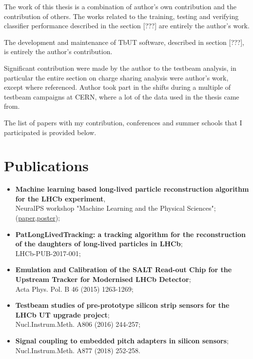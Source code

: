 \noindent The work of this thesis is a combination of author's own contribution and the contribution of others. The works related to the training, testing and verifying classifier performance described in the section [???] are entirely the author's work. 

\noindent The development and maintenance of TbUT software, described in section [???], is entirely the author's contribution. 

\noindent Significant contribution were made by the author to the testbeam analysis, in particular the entire section on charge sharing analysis were author's work, except where referenced. Author took part in the shifts during a multiple of testbeam campaigns at CERN, where a lot of the data used in the thesis came from. 

The list of papers with my contribution, conferences and summer schools that I participated is provided below. 

\section*{Publications}
			\begin{itemize}
			    \item \textbf{Machine learning based long-lived particle reconstruction algorithm for the LHCb experiment},\\ NeuralPS workshop "Machine Learning and the Physical Sciences"; (\textcolor{red}{\href{https://ml4physicalsciences.github.io/2020/files/NeurIPS_ML4PS_2020_148.pdf}{paper}},\textcolor{red}{\href{https://ml4physicalsciences.github.io/2020/files/NeurIPS_ML4PS_2020_148_poster.pdf}{poster}});
			    \item \textbf{PatLongLivedTracking: a tracking algorithm for the reconstruction of the daughters of long-lived particles in LHCb};\\ LHCb-PUB-2017-001;
				\item \textbf{Emulation and Calibration of the SALT Read-out Chip for the Upstream Tracker for Modernised LHCb Detector}; \\
				Acta Phys. Pol. B 46 (2015) 1263-1269;
				\item \textbf{Testbeam studies of pre-prototype silicon strip sensors for the LHCb UT upgrade project};  \\
				Nucl.Instrum.Meth. A806 (2016) 244-257;
				\item \textbf{Signal coupling to embedded pitch adapters in silicon sensors};\\
				Nucl.Instrum.Meth. A877 (2018) 252-258.
			\end{itemize}


